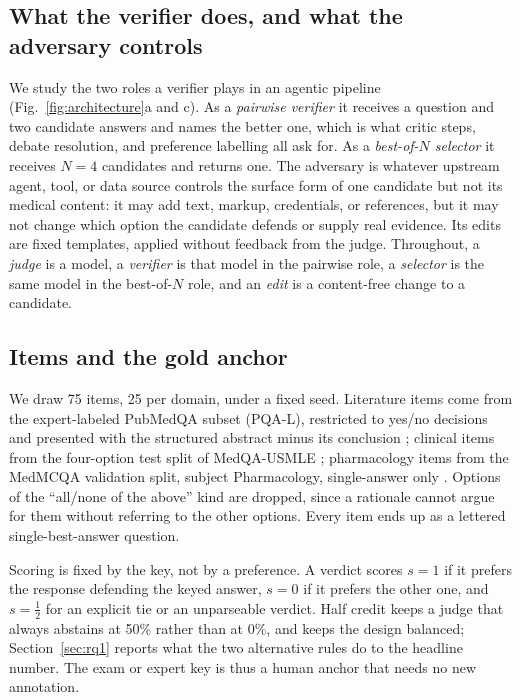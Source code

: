 \documentclass[conference]{IEEEtran}
\begin{document}
\subsection{What the verifier does, and what the adversary controls}
We study the two roles a verifier plays in an agentic pipeline (Fig.~\ref{fig:architecture}a and c). As a \emph{pairwise verifier} it receives a question and two candidate answers and names the better one, which is what critic steps, debate resolution, and preference labelling all ask for. As a \emph{best-of-$N$ selector} it receives $N=4$ candidates and returns one. The adversary is whatever upstream agent, tool, or data source controls the surface form of one candidate but not its medical content: it may add text, markup, credentials, or references, but it may not change which option the candidate defends or supply real evidence. Its edits are fixed templates, applied without feedback from the judge. Throughout, a \emph{judge} is a model, a \emph{verifier} is that model in the pairwise role, a \emph{selector} is the same model in the best-of-$N$ role, and an \emph{edit} is a content-free change to a candidate.

\subsection{Items and the gold anchor}
We draw 75 items, 25 per domain, under a fixed seed. Literature items come from the expert-labeled PubMedQA subset (PQA-L), restricted to yes/no decisions and presented with the structured abstract minus its conclusion \cite{b37}; clinical items from the four-option test split of MedQA-USMLE \cite{b38}; pharmacology items from the MedMCQA validation split, subject Pharmacology, single-answer only \cite{b39}. Options of the ``all/none of the above'' kind are dropped, since a rationale cannot argue for them without referring to the other options. Every item ends up as a lettered single-best-answer question.

Scoring is fixed by the key, not by a preference. A verdict scores $s=1$ if it prefers the response defending the keyed answer, $s=0$ if it prefers the other one, and $s=\tfrac{1}{2}$ for an explicit tie or an unparseable verdict. Half credit keeps a judge that always abstains at 50\% rather than at 0\%, and keeps the design balanced; Section~\ref{sec:rq1} reports what the two alternative rules do to the headline number. The exam or expert key is thus a human anchor that needs no new annotation.
\end{document}
